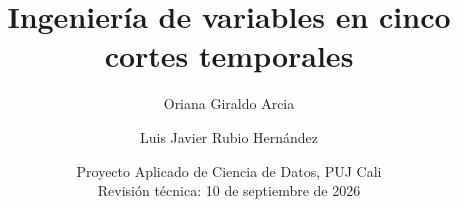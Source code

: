 \documentclass[11pt,a4paper]{article}
\title{\color{azul}Ingeniería de variables en cinco cortes temporales}
\author{Oriana Giraldo Arcia \and Luis Javier Rubio Hernández}
\date{Proyecto Aplicado de Ciencia de Datos, PUJ Cali\\Revisión técnica: 10 de septiembre de 2026}
\renewcommand{\tablename}{Tabla}
\begin{document}
\renewcommand{\tablename}{Tabla}
\maketitle

\par\vspace{6pt}


\end{document}
